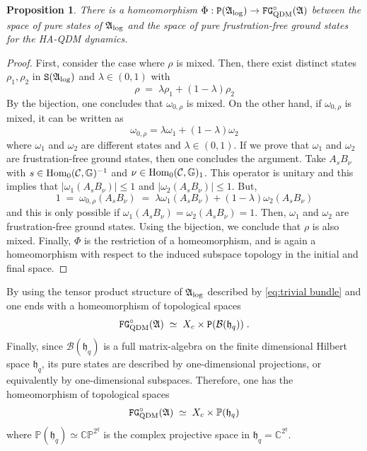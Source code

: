 \documentclass[a4paper,12pt,twoside,reqno]{amsart}
\theoremstyle{plain}
\newtheorem{prop}[teo]{Proposition}
\theoremstyle{definition}
\theoremstyle{remark}
\numberwithin{equation}{section}
\numberwithin{figure}{section}
\numberwithin{table}{section}
\newcommand{\f}[1]{\mathcal{#1}}
\newcommand{\n}[1]{\mathbb{#1}}
\begin{document}
	
	
	\medskip
	
	
	
	
	\begin{prop}\label{prop:bijection_pure_states}
		There is a homeomorphism $\Phi:\mathtt{P}(\mathfrak{A}_{\rm log})\to\mathtt{FG}^\circ_{\rm QDM}(\mathfrak{A})$ between the  space of pure states of $\mathfrak{A}_{\rm log}$ and the
		space of pure frustration-free ground states for the {HA-QDM dynamics}.
	\end{prop}
	
	
	
	
	\begin{proof}
		First, consider the case where $\rho$ is mixed. Then, there exist distinct states $\rho_1,\rho_2$ in $\mathtt{S}(\mathfrak{A}_{\rm log})$ and $\lambda\in (0,1)$ with
		$$\rho\;=\;\lambda\rho_1+(1-\lambda)\rho_2$$
		By the bijection, one concludes that $\omega_{0,\rho}$ is mixed.
		On the other hand, if $\omega_{0,\rho}$ is mixed, it can be written as 
		$$\omega_{0,\rho}=\lambda \omega_1+(1-\lambda)\omega_2$$
		where $\omega_1$ and $\omega_2$ are different states and $\lambda\in (0,1)$. If we prove that $\omega_1$ and $\omega_2$ are frustration-free ground states, then one concludes the argument.
		Take $A_sB_\nu$ with $s\in {\rm Hom}_0(\f{C},\n{G})^{-1}$ and $\nu\in {\rm Hom}_0(\f{C},\n{G})_{1}$. This operator is unitary and this implies that $|\omega_1(A_sB_\nu)|\leq1$ and $|\omega_2(A_sB_\nu)|\leq 1$. But,
		$$
		1\;=\;\omega_{0,\rho}(A_sB_\nu)\;=\;\lambda \omega_1(A_sB_\nu)+(1-\lambda)\omega_2(A_sB_\nu)$$
		and this is only possible if $\omega_1(A_sB_\nu)=\omega_2(A_sB_\nu)=1$. Then, $\omega_1$ and $\omega_2$ are frustration-free ground states. Using the bijection, we conclude that $\rho$ is also mixed. Finally, $\Phi$ 
		is the restriction of a homeomorphism, and is again a 
		homeomorphism with respect to the induced subspace topology
		in the initial and final space.
	\end{proof}
	
	
	
	
	
	\medskip
	
	
	
	
	
	By using the tensor product structure of $\mathfrak{A}_{\rm log}$ described by \eqref{eq:trivial bundle} and \cite[Proposition 2.9]{denittis2025} one ends with a homeomorphism of topological spaces
	$$
	\mathtt{FG}_{\rm QDM}^{\circ}(\mathfrak{A})\;\simeq\; X_c\times \mathtt{P}(\mathcal{B}(\mathfrak{h}_q))\;.
	$$
	Finally, since $\mathcal{B}(\mathfrak{h}_q)$ is a full matrix-algebra 
	on the finite dimensional Hilbert space $\mathfrak{h}_q$, its pure states are described by one-dimensional projections, or equivalently by one-dimensional subspaces. Therefore, one has the  homeomorphism of topological spaces
	$$
	\mathtt{FG}_{\rm QDM}^{\circ}(\mathfrak{A})\;\simeq\; X_c\times \n{P}(\mathfrak{h}_q)
	$$
	where $\n{P}(\mathfrak{h}_q)\simeq \n{CP}^{2^q}$ is the complex projective space in $\mathfrak{h}_q=\n{C}^{2^q}$.
	
\end{document}
